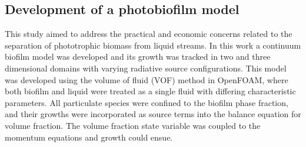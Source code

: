 \subsection{Development of a photobiofilm model}
This study aimed to address the practical and economic concerns related to the separation of phototrophic biomass from liquid streams. In this work a continuum biofilm model was developed and its growth was tracked in two and three dimensional domains with varying radiative source configurations. 
\skippingparagraph
This model was developed using the volume of fluid (VOF) method in OpenFOAM, where both biofilm and liquid were treated as a single fluid with differing characteristic parameters. All particulate species were confined to the biofilm phase fraction, and their growths were incorporated as source terms into the balance equation for volume fraction. The volume fraction state variable was coupled to the momentum equations and growth could ensue.
\skippingparagraph




